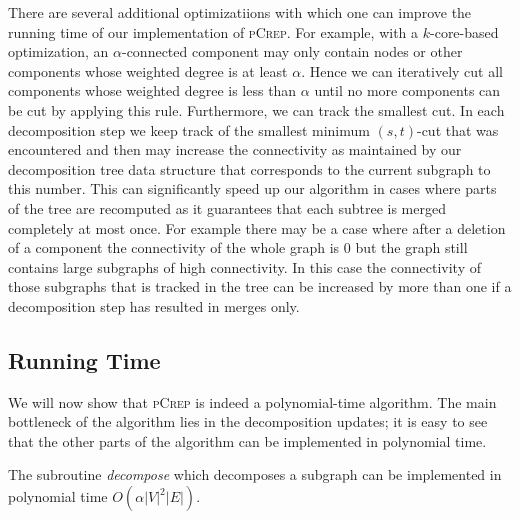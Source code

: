 \documentclass[a4paper,UKenglish,cleveref, autoref, thm-restate,authorcolumns]{lipics-v2019}
\newcommand{\adjDel}{\textsc{pCrep}}
\begin{document}

There are several additional optimizatiions 
with which one can improve the running time of our implementation of \adjDel{}.
For example, with a $k$-core-based optimization, 
an $\alpha$-connected component 
	may only contain nodes or other components whose weighted degree is at least 
	$\alpha$. Hence we can iteratively cut all components whose weighted degree is 
	less than $\alpha$ until no more components can be cut by applying this rule.
Furthermore, we can track the smallest cut.
	In each decomposition step we keep track of the smallest minimum $(s,t)$-cut 
	that was encountered and then may increase the connectivity as maintained by 
	our decomposition tree data structure that corresponds to the current subgraph 
	to this number. This can significantly speed up our algorithm in cases where 
	parts of the tree are recomputed as it guarantees that each subtree is merged 
	completely at most once. For example there may be a case where after a deletion 
	of a component the connectivity of the whole graph is 0 but the graph still 
	contains large subgraphs of high connectivity. In this case the connectivity 
	of those subgraphs that is tracked in the tree can be increased by more than 
	one if a decomposition step has resulted in merges only.

\subsection{Running Time}
\label{run_time_sec}

We will now show that \adjDel{} is indeed a polynomial-time
algorithm.
The main bottleneck of the algorithm lies in the decomposition updates;
it is easy to see that 
the other parts of the algorithm can be implemented in polynomial time.

\begin{lemma}
	\label{dec_run_time_lem}
	The subroutine \textit{decompose} which decomposes a subgraph can be implemented in polynomial time $O(\alpha|V|^2|E|)$.
\end{lemma}
\end{document}
